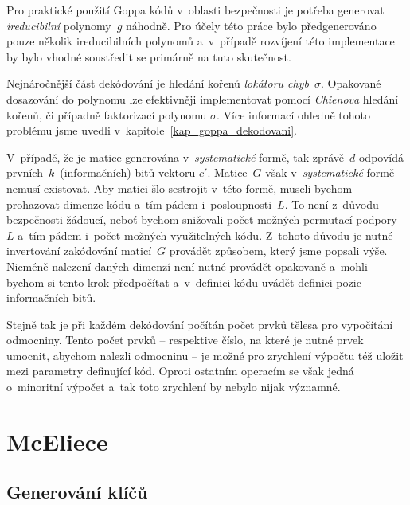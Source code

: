 \documentclass[thesis=M,czech,hidelinks]{FITthesis}[2012/06/26]
\newcommand{\0}{{\textcolor[gray]{0.75}{0}}}
\begin{document}
Pro praktické použití Goppa kódů v~oblasti bezpečnosti je potřeba generovat
\emph{ireducibilní} polynomy~$g$ náhodně. Pro účely této práce bylo
předgenerováno pouze několik ireducibilních polynomů a~v~případě rozvíjení této
implementace by bylo vhodné soustředit se primárně na tuto skutečnost.

Nejnáročnější část dekódování je hledání kořenů \emph{lokátoru chyb}~$\sigma$.
Opakované dosazování do polynomu lze efektivněji implementovat pomocí
\emph{Chienova} hledání kořenů, či případně faktorizací polynomu $\sigma$. Více
informací ohledně tohoto problému jsme uvedli
v~kapitole~\ref{kap_goppa_dekodovani}.

V~případě, že je matice generována v~\emph{systematické} formě, tak zprávě~$d$
odpovídá prvních~$k$~(informačních) bitů vektoru $c'$. Matice~$G$ však
v~\emph{systematické} formě nemusí existovat. Aby matici šlo sestrojit v~této
formě, museli bychom prohazovat dimenze kódu a~tím pádem i~posloupnosti~$L$. To
není z~důvodu bezpečnosti žádoucí, neboť bychom snižovali počet možných
permutací podpory~$L$ a~tím pádem i~počet možných využitelných kódu. Z~tohoto
důvodu je nutné invertování zakódování maticí~$G$ provádět způsobem, který jsme
popsali výše.  Nicméně nalezení daných dimenzí není nutné provádět opakovaně
a~mohli bychom si tento krok předpočítat a~v~definici kódu uvádět definici pozic
informačních bitů.

Stejně tak je při každém dekódování počítán počet prvků tělesa pro vypočítání
odmocniny. Tento počet prvků -- respektive číslo, na které je nutné prvek umocnit,
abychom nalezli odmocninu -- je možné pro zrychlení výpočtu též uložit mezi
parametry definující kód. Oproti ostatním operacím se však jedná o~minoritní
výpočet a~tak toto zrychlení by nebylo nijak významné.


\clearpage

\section{McEliece}


\subsection{Generování klíčů}

\end{document}
